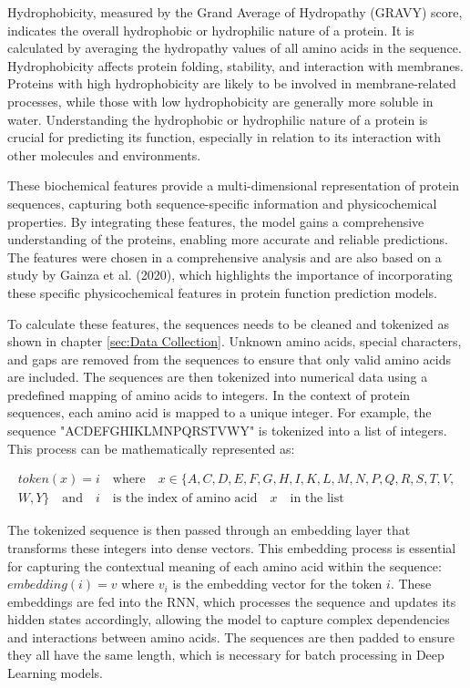 Hydrophobicity, measured by the Grand Average of Hydropathy (GRAVY) score, indicates the overall hydrophobic or hydrophilic nature of a protein. It is calculated by averaging the hydropathy values of all amino acids in the sequence. Hydrophobicity affects protein folding, stability, and interaction with membranes. Proteins with high hydrophobicity are likely to be involved in membrane-related processes, while those with low hydrophobicity are generally more soluble in water. Understanding the hydrophobic or hydrophilic nature of a protein is crucial for predicting its function, especially in relation to its interaction with other molecules and environments. \autocite{khosraviIdentificationCharacterizationInulinases2023}

These biochemical features provide a multi-dimensional representation of protein sequences, capturing both sequence-specific information and physicochemical properties. By integrating these features, the model gains a comprehensive understanding of the proteins, enabling more accurate and reliable predictions. The features were chosen in a comprehensive analysis and are also based on a study by Gainza et al. (2020), which highlights the importance of incorporating these specific physicochemical features in protein function prediction models. \autocite{gainzaDecipheringInteractionFingerprints2020}

To calculate these features, the sequences needs to be cleaned and tokenized as shown in chapter \ref{sec:Data Collection}. Unknown amino acids, special characters, and gaps are removed from the sequences to ensure that only valid amino acids are included. The sequences are then tokenized into numerical data using a predefined mapping of amino acids to integers. In the context of protein sequences, each amino acid is mapped to a unique integer. For example, the sequence "ACDEFGHIKLMNPQRSTVWY" is tokenized into a list of integers. This process can be mathematically represented as:

\begin{align*}
    token(x)=i\quad\text{where}\quad x \in \{A, C, D, E, F, G, H, I, K, L, M, N, P, Q, R, S, T, V, \\
    W, Y\} \quad \text{and} \quad i \quad \text{is the index of amino acid} \quad x \quad \text{in the list}
\end{align*}

The tokenized sequence is then passed through an embedding layer that transforms these integers into dense vectors. This embedding process is essential for capturing the contextual meaning of each amino acid within the sequence:
$embedding(i) = v$ where $v_i$ is the embedding vector for the token $i$. These embeddings are fed into the RNN, which processes the sequence and updates its hidden states accordingly, allowing the model to capture complex dependencies and interactions between amino acids. The sequences are then padded to ensure they all have the same length, which is necessary for batch processing in Deep Learning models.

